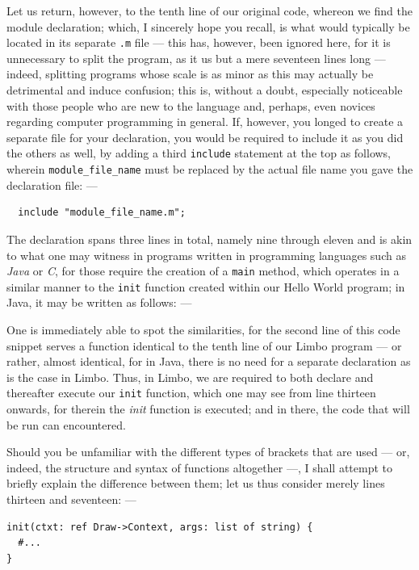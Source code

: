 \documentclass[a5paper,twoside,12pt]{report}
\begin{document}
Let us return, however, to the tenth line of our original code, whereon we find the module declaration; which, I sincerely hope you recall, is what would typically be located in its separate \texttt{.m} file — this has, however, been ignored here, for it is unnecessary to split the program, as it us but a mere seventeen lines long — indeed, splitting programs whose scale is as minor as this may actually be detrimental and induce confusion; this is, without a doubt, especially noticeable with those people who are new to the language and, perhaps, even novices regarding computer programming in general. If, however, you longed to create a separate file for your declaration, you would be required to include it as you did the others as well, by adding a third \texttt{include} statement at the top as follows, wherein \texttt{module\_file\_name} must be replaced by the actual file name you gave the declaration file: —

\begin{lstlisting}
  include "module_file_name.m";
\end{lstlisting}

The declaration spans three lines in total, namely nine through eleven and is akin to what one may witness in programs written in programming languages such as \textit{Java} or \textit{C}, for those require the creation of a \texttt{main} method, which operates in a similar manner to the \texttt{init} function created within our Hello World program; in Java, it may be written as follows: —



One is immediately able to spot the similarities, for the second line of this code snippet serves a function identical to the tenth line of our Limbo program — or rather, almost identical, for in Java, there is no need for a separate declaration as is the case in Limbo. Thus, in Limbo, we are required to both declare and thereafter execute our \texttt{init} function, which one may see from line thirteen onwards, for therein the \textit{init} function is executed; and in there, the code that will be run can encountered.

Should you be unfamiliar with the different types of brackets that are used — or, indeed, the structure and syntax of functions altogether —, I shall attempt to briefly explain the difference between them; let us thus consider merely lines thirteen and seventeen: —

\begin{lstlisting}
init(ctxt: ref Draw->Context, args: list of string) {
  #...
}
\end{lstlisting}
\end{document}
